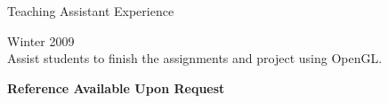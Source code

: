 \documentclass[10pt]{article}
\newenvironment{mydescription}{%
    \begin{description}
        \setlength{\itemsep}{0.25em}%
        \setlength{\parsep}{0em}%
        \setlength{\topsep}{\itemsep}%
        \setlength{\parskip}{0em}%
        \setlength{\labelwidth}{0.1em}
        \setlength{\labelsep}{0em} 
    }%
{\end{description}}
\begin{document}
\begin{cv}
\begin{cvlist}{Teaching Assistant Experience}
\begin{mydescription}
        \item[Teaching assistant, \emph{Advanced Computer Graphics}, Concordia University] \hfill Winter 2009 \\
            Assist students to finish the assignments and project using OpenGL. 
    \end{mydescription}
\end{cvlist}

\begin{center}
    \textbf{Reference Available Upon Request}
\end{center}

\end{cv} 
\end{document}
